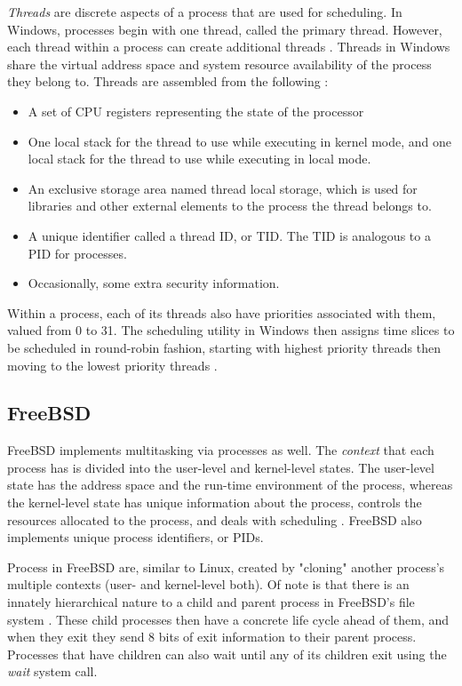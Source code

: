 \documentclass[10pt,draftclsnofoot,onecolumn,compsoc]{IEEEtran}
\begin{document}
	\textit{Threads} are discrete aspects of a process that are used for scheduling. In Windows, processes begin with one thread, called the primary thread. However, each thread within a process can create additional threads \cite{msdnproc}. Threads in Windows share the virtual address space and system resource availability of the process they belong to. Threads are assembled from the following \cite{WInternals}:
	\begin{itemize}
		\item A set of CPU registers representing the state of the processor
		\item One local stack for the thread to use while executing in kernel mode, and one local stack for the thread to use while executing in local mode.
		\item An exclusive storage area named thread local storage, which is used for libraries and other external elements to the process the thread belongs to.
		\item A unique identifier called a thread ID, or TID. The TID is analogous to a PID for processes.
		\item Occasionally, some extra security information.
	\end{itemize}

	Within a process, each of its threads also have priorities associated with them, valued from 0 to 31. \cite{msdnsched} The scheduling utility in Windows then assigns time slices to be scheduled in round-robin fashion, starting with highest priority threads then moving to the lowest priority threads \cite{msdnproc}.
	
	
	\subsection{FreeBSD}
	
	FreeBSD implements multitasking via processes as well. The \textit{context} that each process has is divided into the user-level and kernel-level states. The user-level state has the address space and the run-time environment of the process, whereas the kernel-level state has unique information about the process, controls the resources allocated to the process, and deals with scheduling \cite{BSD}. FreeBSD also implements unique process identifiers, or PIDs.
	
	Process in FreeBSD are, similar to Linux, created by "cloning" another process's multiple contexts (user- and kernel-level both). Of note is that there is an innately hierarchical nature to a child and parent process in FreeBSD's file system \cite{BSD}. These child processes then have a concrete life cycle ahead of them, and when they exit they send 8 bits of exit information to their parent process. Processes that have children can also wait until any of its children exit using the \textit{wait} system call.
	
\end{document}
